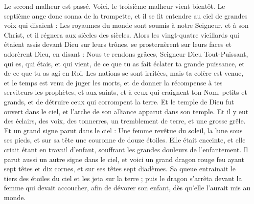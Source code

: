 \begin{multicols}{2}
Le second malheur est passé. Voici, le troisième malheur vient bientôt.
Le septième ange donc sonna de la trompette, et il se fit entendre au ciel de grandes voix qui disaient : Les royaumes du monde sont soumis à notre Seigneur, et à son Christ, et il régnera aux siècles des siècles.
Alors les vingt-quatre vieillards qui étaient assis devant Dieu sur leurs trônes, se prosternèrent sur leurs faces et adorèrent Dieu,
en disant : Nous te rendons grâces, Seigneur Dieu Tout-Puissant, qui es, qui étais, et qui vient, de ce que tu as fait éclater ta grande puissance, et de ce que tu as agi en Roi.
Les nations se sont irritées, mais ta colère est venue, et le temps est venu de juger les morts, et de donner la récompense à tes serviteurs les prophètes, et aux saints, et à ceux qui craignent ton Nom, petits et grands, et de détruire ceux qui corrompent la terre.
Et le temple de Dieu fut ouvert dans le ciel, et l'arche de son alliance apparut dans son temple. Et il y eut des éclairs, des voix, des tonnerres, un tremblement de terre, et une grosse grêle.
\VerseOne{}Et un grand signe parut dans le ciel : Une femme revêtue du soleil, la lune sous ses pieds, et sur sa tête une couronne de douze étoiles{}.
Elle était enceinte, et elle criait étant en travail d’enfant, souffrant les grandes douleurs de l'enfantement.
Il parut aussi un autre signe dans le ciel, et voici un grand dragon rouge feu ayant sept têtes et dix cornes, et sur ses têtes sept diadèmes.
Sa queue entrainait le tiers des étoiles du ciel et les jeta sur la terre{} ; puis le dragon s'arrêta devant la femme qui devait accoucher, afin de dévorer son enfant{}, dès qu'elle l'aurait mis au monde.

\end{multicols}
